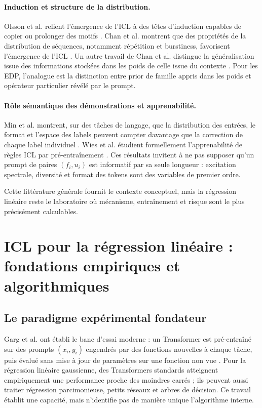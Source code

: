 \documentclass[11pt,a4paper]{article}
\begin{document}
\paragraph{Induction et structure de la distribution.}
Olsson et al. relient l'émergence de l'ICL à des têtes d'induction capables de
copier ou prolonger des motifs \cite{olsson2022}. Chan et al. montrent que des
propriétés de la distribution de séquences, notamment répétition et burstiness,
favorisent l'émergence de l'ICL \cite{chan2022distribution}. Un autre travail
de Chan et al. distingue la généralisation issue des informations stockées
dans les poids de celle issue du contexte \cite{chan2022weightscontext}. Pour
les EDP, l'analogue est la distinction entre prior de famille appris dans les
poids et opérateur particulier révélé par le prompt.

\paragraph{Rôle sémantique des démonstrations et apprenabilité.}
Min et al. montrent, sur des tâches de langage, que la distribution des entrées,
le format et l'espace des labels peuvent compter davantage que la correction
de chaque label individuel \cite{min2022demonstrations}. Wies et al. étudient
formellement l'apprenabilité de règles ICL par pré-entraînement
\cite{wies2023learnability}. Ces résultats invitent à ne pas supposer qu'un
prompt de paires $(f_i,u_i)$ est informatif par sa seule longueur : excitation
spectrale, diversité et format des tokens sont des variables de premier ordre.

Cette littérature générale fournit le contexte conceptuel, mais la régression
linéaire reste le laboratoire où mécanisme, entraînement et risque sont le plus
précisément calculables.

\section{ICL pour la régression linéaire : fondations empiriques et algorithmiques}

\subsection{Le paradigme expérimental fondateur}

Garg et al. ont établi le banc d'essai moderne : un Transformer est pré-entraîné
sur des prompts $(x_i,y_i)$ engendrés par des fonctions nouvelles à chaque
tâche, puis évalué sans mise à jour de paramètres sur une fonction non vue
\cite{garg2022}. Pour la régression linéaire gaussienne, des Transformers
standards atteignent empiriquement une performance proche des moindres carrés ;
ils peuvent aussi traiter régression parcimonieuse, petits réseaux et arbres de
décision. Ce travail établit une capacité, mais n'identifie pas de manière
unique l'algorithme interne.
\end{document}
